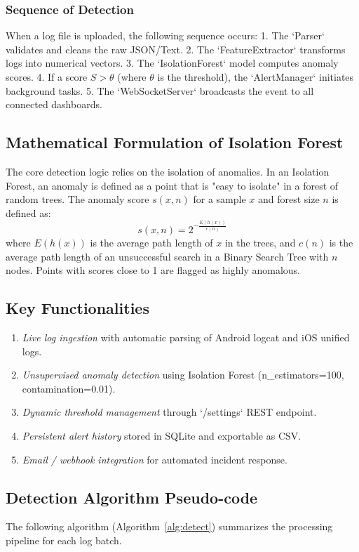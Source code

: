 \documentclass[preprint,12pt,a4paper]{elsarticle}
\begin{document}
\subsubsection{Sequence of Detection}
When a log file is uploaded, the following sequence occurs:
1. The `Parser` validates and cleans the raw JSON/Text.
2. The `FeatureExtractor` transforms logs into numerical vectors.
3. The `IsolationForest` model computes anomaly scores.
4. If a score $S > \theta$ (where $\theta$ is the threshold), the `AlertManager` initiates background tasks.
5. The `WebSocketServer` broadcasts the event to all connected dashboards.

\subsection{Mathematical Formulation of Isolation Forest}
The core detection logic relies on the isolation of anomalies. In an Isolation Forest, an anomaly is defined as a point that is "easy to isolate" in a forest of random trees.
The anomaly score $s(x, n)$ for a sample $x$ and forest size $n$ is defined as:
\begin{equation}
    s(x, n) = 2^{-\frac{E(h(x))}{c(n)}}
\end{equation}
where $E(h(x))$ is the average path length of $x$ in the trees, and $c(n)$ is the average path length of an unsuccessful search in a Binary Search Tree with $n$ nodes. Points with scores close to 1 are flagged as highly anomalous.


\subsection{Key Functionalities}
\begin{enumerate}[label=\arabic*.]
    \item \textit{Live log ingestion} with automatic parsing of Android logcat and iOS unified logs.
    \item \textit{Unsupervised anomaly detection} using Isolation Forest (n_estimators=100, contamination=0.01).
    \item \textit{Dynamic threshold management} through `/settings` REST endpoint.
    \item \textit{Persistent alert history} stored in SQLite and exportable as CSV.
    \item \textit{Email / webhook integration} for automated incident response.
\end{enumerate}


\subsection{Detection Algorithm Pseudo-code}
The following algorithm (Algorithm~\ref{alg:detect}) summarizes the processing pipeline for each log batch.
\end{document}
